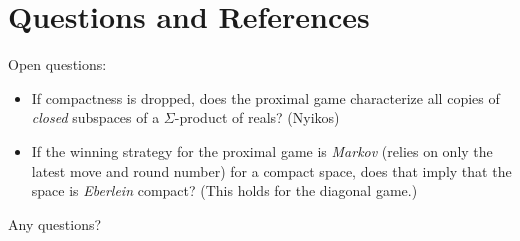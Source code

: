 \documentclass{beamer}
\theoremstyle{definition}
\newcommand{\<}{\langle}
\renewcommand{\>}{\rangle}
\newcommand{\term}{\textit}
\begin{document}
\section{Questions and References}

\begin{frame}
  Open questions:

  \begin{itemize}
    \item If compactness is dropped, does the proximal game characterize
    all copies of \textit{closed} subspaces of a $\Sigma$-product of reals?
    (Nyikos)
    \item If the winning strategy for the proximal game is \term{Markov}
    (relies on only the latest move and round number) for a compact space,
    does that imply that the space is \term{Eberlein} compact?
    (This holds for the diagonal game.)
  \end{itemize}
\end{frame}


\begin{frame}[allowframebreaks]
  \tiny
  
  
\end{frame}

\begin{frame}
  Any questions?
\end{frame}
\end{document}
